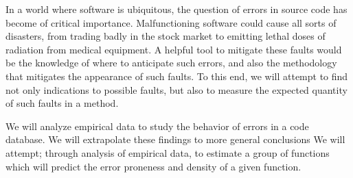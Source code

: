 In a world where software is ubiquitous, the question of errors in source code
has become of critical importance. Malfunctioning software could cause all
sorts of disasters, from trading badly in the stock market to emitting lethal
doses of radiation from medical equipment. A helpful tool to mitigate these
faults would be the knowledge of where to anticipate such errors, and also the
methodology that mitigates the appearance of such faults. To this end, we will
attempt to find not only indications to possible faults, but also to measure
the expected quantity of such faults in a method. 

We will analyze empirical data to study the behavior of errors in a code database.
We will extrapolate these findings to more general conclusions
We will attempt; through analysis of empirical data, to estimate a group of functions which will predict the error proneness and density of a given function.
